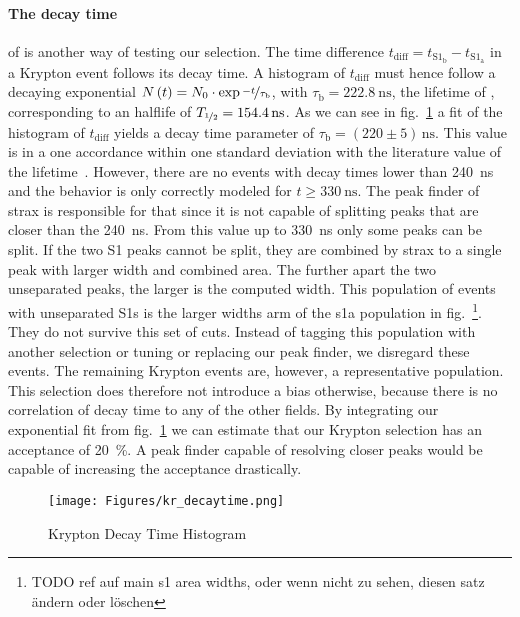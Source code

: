\paragraph{The decay time} of  is another way of testing our selection.
The time difference $ t_\mathrm{diff} = t_{\mathrm{S}1_\mathrm{b}} - t_{\mathrm{S}1_\mathrm{a}} $ in a Krypton event follows its decay time.
A histogram of $ t_\mathrm{diff} $ must hence follow a decaying exponential $ N \left( t \right) = N_0 \cdot \exp{\nicefrac{-t}{\tau_\mathrm{b}}} $, with $ \tau_\mathrm{b} = \SI{222.8}{\nano\s} $, the lifetime of , corresponding to an halflife of $ T_{\nicefrac{1}{2}} = 154.4\,\mathrm{ns} $.
As we can see in fig.~\ref{fig:kr-decaytime} a fit of the histogram of $ t_\mathrm{diff} $ yields a decay time parameter of $ \tau_\mathrm{b} = (220 \pm 5)\,\mathrm{ns} $.
This value is in a one accordance within one standard deviation with the literature value of the lifetime~\cite{?}.  %
However, there are no events with decay times lower than \SI{240}{\nano\s} and the behavior is only correctly modeled for $ t \ge \SI{330}{\nano\s} $.
The peak finder of strax is responsible for that since it is not capable of splitting peaks that are closer than the \SI{240}{\nano\s}.
From this value up to \SI{330}{\nano\s} only some peaks can be split.
If the two S1 peaks cannot be split, they are combined by strax to a single peak with larger width and combined area.
The further apart the two unseparated peaks, the larger is the computed width.
This population of events with unseparated S1s is the larger widths arm of the \gls{s1a} population in fig.~\footnote{TODO ref auf main s1 area widths, oder wenn nicht zu sehen, diesen satz ändern oder löschen}.
They do not survive this set of cuts.
Instead of tagging this population with another selection or tuning or replacing our peak finder, we disregard these events.
The remaining Krypton events are, however, a representative population.
This selection does therefore not introduce a bias otherwise, because there is no correlation of decay time to any of the other fields.
By integrating our exponential fit from fig.~\ref{fig:kr-decaytime} we can estimate that our Krypton selection has an acceptance of \SI{20}{\%}.
A peak finder capable of resolving closer peaks would be capable of increasing the acceptance drastically.


\begin{figure}
\centering
\texttt{[image: Figures/kr\_decaytime.png]}  %
\caption[Krypton Decay Time Histogram]{
    Krypton Decay Time Histogram
    }
\label{fig:kr-decaytime}
\end{figure}



\FloatBarrier

